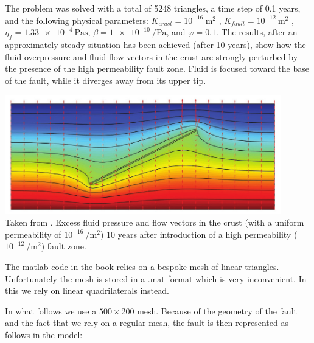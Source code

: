 The problem was solved with a total of 5248 triangles, 
a time step of 0.1 years, and the following physical parameters:
$K_{crust}=10^{-16}~\si{\square\meter}$ , 
$K_{fault}=10^{-12}~\si{\square\meter}$ , 
$\eta_f  = \SI{1.33e-4}{\pascal\second}$, 
$\beta=\SI{1e-10}{\per\pascal}$, and $\varphi=0.1$. 
The results, after an approximately steady situation has been achieved (after 10 years), show how the fluid overpressure
and fluid flow vectors in the crust are strongly perturbed by the presence of the high permeability
fault zone. Fluid is focused toward the base of the fault, while it diverges away from its upper tip.
\begin{center}
\includegraphics[width=12cm]{python_codes/fieldstone_128/images/simpson2}\\
{\captionfont Taken from \cite{simp17}. Excess fluid pressure and flow vectors in the crust 
(with a uniform permeability of $10^{-16}~\si{\per\square\meter}$) 10 years after
introduction of a high permeability ($10^{-12}~\si{\per\square\meter}$) fault zone.}
\end{center}

The matlab code in the book relies on a bespoke mesh of linear triangles. Unfortunately the 
mesh is stored in a .mat format which is very inconvenient. In this \stone we rely on 
linear quadrilaterals instead. 

In what follows we use a $500\times 200$ mesh. Because of the geometry of the fault and the fact that we rely on 
a regular mesh, the fault is then represented as follows in the model:

